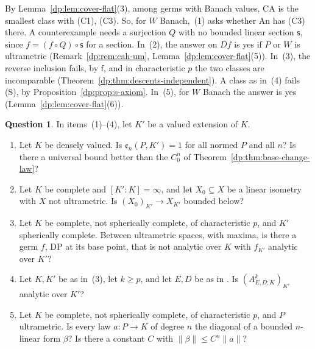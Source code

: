 \documentclass[11pt]{amsart}
\theoremstyle{definition}
\theoremstyle{remark}
\numberwithin{equation}{section}
\newcommand{\norm}[1]{\lVert #1\rVert}
\theoremstyle{plain}
\theoremstyle{definition}
\newtheorem{question}[theorem]{Question}
\theoremstyle{plain}
\begin{document}
By Lemma~\ref{dp:lem:cover-flat}(3), among germs with Banach values, CA is the smallest class with (C1), (C3). So, for $W$ Banach,~(1) asks whether An has (C3) there. A counterexample needs a surjection $Q$ with no bounded linear section $\mathsf s$, since $f=(f\circ Q)\circ\mathsf s$ for a section. In~(2), the answer on $Df$ is yes if $P$ or $W$ is ultrametric (Remark~\ref{dp:rem:cah-um}, Lemma~\ref{dp:lem:cover-flat}(5)). In~(3), the reverse inclusion fails, by $\mathsf f$, and in characteristic $p$ the two classes are incomparable (Theorem~\ref{dp:thm:descents-independent}). A class as in~(4) fails (S), by Proposition~\ref{dp:prop:s-axiom}. In~(5), for $W$ Banach the answer is yes (Lemma~\ref{dp:lem:cover-flat}(6)).

\begin{question}\label{dp:q:base-change}
In items~(1)--(4), let $K'$ be a valued extension of $K$.
\begin{enumerate}
\item Let $K$ be densely valued. Is $\mathfrak e_n(P,K')=1$ for all normed $P$ and all $n$? Is there a universal bound better than the $C_0^n$ of Theorem~\ref{dp:thm:base-change-law}?
\item Let $K$ be complete and $[K':K]=\infty$, and let $X_0\subseteq X$ be a linear isometry with $X$ not ultrametric. Is $(X_0)_{K'}\to X_{K'}$ bounded below?
\item Let $K$ be complete, not spherically complete, of characteristic $p$, and $K'$ spherically complete. Between ultrametric spaces, with maxima, is there a germ $f$, DP at its base point, that is not analytic over $K$ with $f_{K'}$ analytic over $K'$?
\item Let $K,K'$ be as in~\textup{(3)}, let $k\ge p$, and let $E,D$ be as in \cite[Theorem~7.2(2)]{I}. Is $(A^k_{E,D;K})_{K'}$ analytic over $K'$?
\item Let $K$ be complete, not spherically complete, of characteristic $p$, and $P$ ultrametric. Is every law $a\colon P\to K$ of degree $n$ the diagonal of a bounded $n$\nobreakdash-linear form $\beta$? Is there a constant $C$ with $\norm\beta\le C^n\norm a$?
\end{enumerate}
\end{question}
\end{document}
